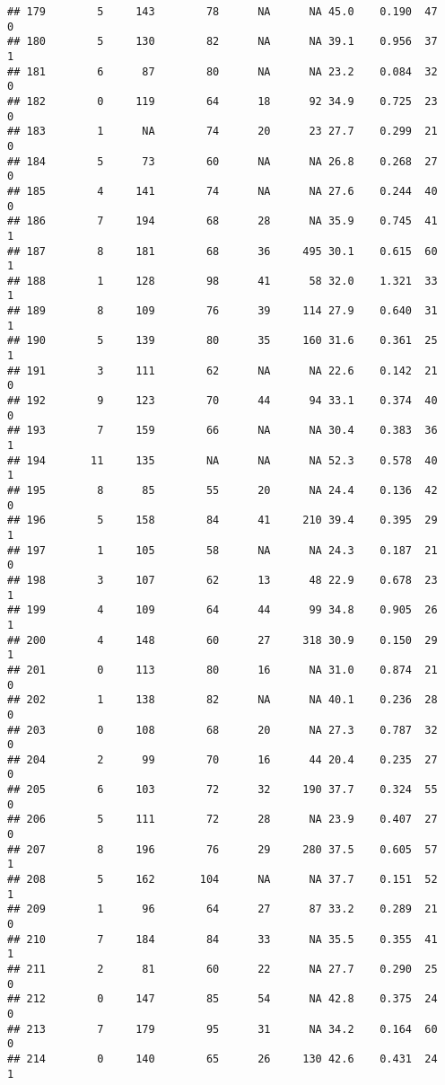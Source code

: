 \documentclass[
]{article}
\begin{document}
\begin{verbatim}
## 179        5     143        78      NA      NA 45.0    0.190  47    0
## 180        5     130        82      NA      NA 39.1    0.956  37    1
## 181        6      87        80      NA      NA 23.2    0.084  32    0
## 182        0     119        64      18      92 34.9    0.725  23    0
## 183        1      NA        74      20      23 27.7    0.299  21    0
## 184        5      73        60      NA      NA 26.8    0.268  27    0
## 185        4     141        74      NA      NA 27.6    0.244  40    0
## 186        7     194        68      28      NA 35.9    0.745  41    1
## 187        8     181        68      36     495 30.1    0.615  60    1
## 188        1     128        98      41      58 32.0    1.321  33    1
## 189        8     109        76      39     114 27.9    0.640  31    1
## 190        5     139        80      35     160 31.6    0.361  25    1
## 191        3     111        62      NA      NA 22.6    0.142  21    0
## 192        9     123        70      44      94 33.1    0.374  40    0
## 193        7     159        66      NA      NA 30.4    0.383  36    1
## 194       11     135        NA      NA      NA 52.3    0.578  40    1
## 195        8      85        55      20      NA 24.4    0.136  42    0
## 196        5     158        84      41     210 39.4    0.395  29    1
## 197        1     105        58      NA      NA 24.3    0.187  21    0
## 198        3     107        62      13      48 22.9    0.678  23    1
## 199        4     109        64      44      99 34.8    0.905  26    1
## 200        4     148        60      27     318 30.9    0.150  29    1
## 201        0     113        80      16      NA 31.0    0.874  21    0
## 202        1     138        82      NA      NA 40.1    0.236  28    0
## 203        0     108        68      20      NA 27.3    0.787  32    0
## 204        2      99        70      16      44 20.4    0.235  27    0
## 205        6     103        72      32     190 37.7    0.324  55    0
## 206        5     111        72      28      NA 23.9    0.407  27    0
## 207        8     196        76      29     280 37.5    0.605  57    1
## 208        5     162       104      NA      NA 37.7    0.151  52    1
## 209        1      96        64      27      87 33.2    0.289  21    0
## 210        7     184        84      33      NA 35.5    0.355  41    1
## 211        2      81        60      22      NA 27.7    0.290  25    0
## 212        0     147        85      54      NA 42.8    0.375  24    0
## 213        7     179        95      31      NA 34.2    0.164  60    0
## 214        0     140        65      26     130 42.6    0.431  24    1

\end{verbatim}
\end{document}
